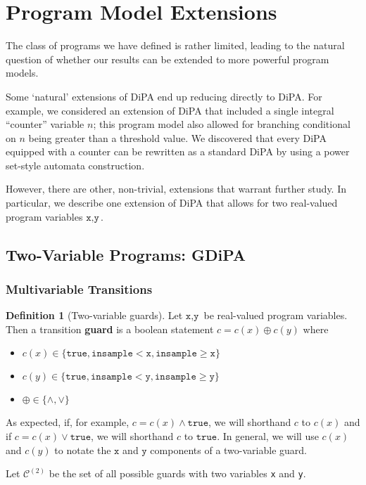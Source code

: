 \documentclass[12pt]{article}
\newcommand{\gguard}[1][x]{\texttt{insample}\geq #1}
\newcommand{\lguard}[1][x]{\texttt{insample} < #1}
\theoremstyle{definition}
\newtheorem{defn}[thm]{Definition}
\begin{document}
\section{Program Model Extensions}

The class of programs we have defined is rather limited, leading to the natural question of whether our results can be extended to more powerful program models. 

Some `natural' extensions of DiPA end up reducing directly to DiPA. For example, we considered an extension of DiPA that included a single integral ``counter'' variable $n$; this program model also allowed for branching conditional on $n$ being greater than a threshold value. 
We discovered that every DiPA equipped with a counter can be rewritten as a standard DiPA by using a power set-style automata construction. 

However, there are other, non-trivial, extensions that warrant further study. In particular, we describe one extension of DiPA that allows for two real-valued program variables $\texttt{x}, \texttt{y}$.

\subsection{Two-Variable Programs: GDiPA}

\subsubsection{Multivariable Transitions}

\begin{defn}[Two-variable guards]
    Let $\texttt{x}, \texttt{y}$ be real-valued program variables. Then a transition \textbf{guard} is a boolean statement $c = c(x)\oplus c(y)$ where \begin{itemize}
        \item $c(x)\in \{\texttt{true}, \lguard[\texttt{x}], \gguard[\texttt{x}]\}$
        \item $c(y)\in \{\texttt{true}, \lguard[\texttt{y}], \gguard[\texttt{y}]\}$
        \item $\oplus \in \{\land, \lor\}$
    \end{itemize}
    As expected, if, for example, $c = c(x) \land \texttt{true}$, we will shorthand $c$ to $c(x)$ and if $c = c(x)\lor \texttt{true}$, we will shorthand $c$ to $\texttt{true}$. In general, we will use $c(x)$ and $c(y)$ to notate the $\texttt{x}$ and $\texttt{y}$ components of a two-variable guard. 

    Let $\mathcal{C}^{(2)}$ be the set of all possible guards with two variables \texttt{x} and \texttt{y}.
\end{defn}
\end{document}
